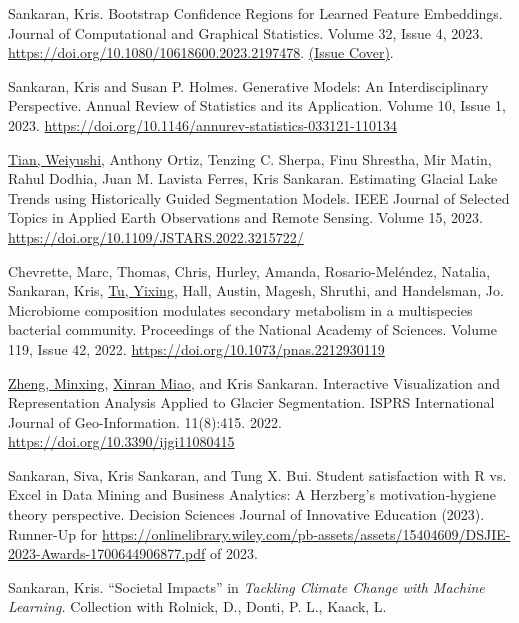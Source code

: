 \documentclass[letterpaper]{article}
\renewenvironment{itemize}{
  \begin{list}{}{
    \setlength{\leftmargin}{1.5em}
  }
}{
  \end{list}
}
\begin{document}
\begin{itemize}
\item Sankaran, Kris. Bootstrap Confidence Regions for Learned Feature
Embeddings. Journal of Computational and Graphical Statistics. Volume 32, Issue 4, 2023.
\href{https://doi.org/10.1080/10618600.2023.2197478}{https://doi.org/10.1080/10618600.2023.2197478}.
\href{https://www.tandfonline.com/toc/ucgs20/current}{(Issue Cover)}.
\item Sankaran, Kris and Susan P. Holmes. Generative Models: An
Interdisciplinary Perspective. Annual Review of Statistics and its
Application. Volume 10, Issue 1, 2023. \href{https://doi.org/10.1146/annurev-statistics-033121-110134}{https://doi.org/10.1146/annurev-statistics-033121-110134}
\item \underline{Tian, Weiyushi}, Anthony Ortiz, Tenzing C. Sherpa, Finu Shrestha, Mir
Matin, Rahul Dodhia, Juan M. Lavista Ferres, Kris Sankaran. Estimating
Glacial Lake Trends using Historically Guided Segmentation Models. IEEE Journal
of Selected Topics in Applied Earth Observations and Remote Sensing. Volume 15,
2023. \href{https://doi.org/10.1109/JSTARS.2022.3215722/}{https://doi.org/10.1109/JSTARS.2022.3215722/}
\item Chevrette, Marc, Thomas, Chris, Hurley, Amanda, Rosario-Mel{\'e}ndez,
Natalia, Sankaran, Kris, \underline{Tu, Yixing}, Hall, Austin, Magesh, Shruthi,
and Handelsman, Jo. Microbiome composition modulates secondary metabolism in a
multispecies bacterial community. Proceedings of the National Academy of
Sciences. Volume 119, Issue 42, 2022. \href{https://doi.org/10.1073/pnas.2212930119}{https://doi.org/10.1073/pnas.2212930119}
\item \underline{Zheng, Minxing}, \underline{Xinran Miao}, and Kris Sankaran.
Interactive Visualization and Representation Analysis Applied to Glacier
Segmentation. ISPRS International Journal of Geo-Information. 11(8):415. 2022.
\href{https://doi.org/10.3390/ijgi11080415}{https://doi.org/10.3390/ijgi11080415}
\item Sankaran, Siva, Kris Sankaran, and Tung X. Bui. Student satisfaction with R vs. Excel in Data
Mining and Business Analytics: A Herzberg's motivation‐hygiene theory
perspective. Decision Sciences Journal of Innovative Education (2023). Runner-Up for \href{DSJIE Best Research Paper}{https://onlinelibrary.wiley.com/pb-assets/assets/15404609/DSJIE-2023-Awards-1700644906877.pdf} of 2023.
\item Sankaran, Kris. ``Societal Impacts'' in \textit{Tackling Climate Change
with Machine Learning.} Collection with Rolnick, D., Donti, P. L., Kaack, L.

\end{itemize}
\end{document}
